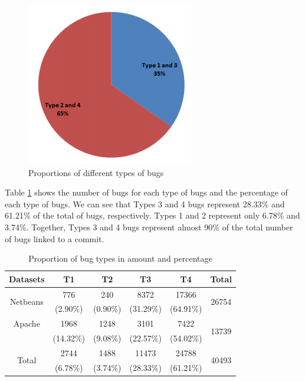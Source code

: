 \begin{figure}[h!]
  \centering
    \includegraphics[scale=0.7]{media/bug-taxo-rq1.png}
    \caption{Proportions of different types of bugs
    \label{fig:bug-taxo-rq1}}
\end{figure}

Table \ref{tab:bug-taxo-rq1-prop} shows the number of bugs for each type of bugs
and the percentage of each type of bugs. We can see that
Types 3 and 4 bugs represent 28.33\% and 61.21\% of the total
of bugs, respectively. Types 1 and 2 represent only 6.78\% and
3.74\%. Together, Types 3 and 4 bugs represent almost 90\%
of the total number of bugs linked to a commit.

\begin{table}[h!]
\centering

\begin{tabular}{c|c|c|c|c|c}
Datasets                  & T1        & T2       & T3        & T4        & Total                  \\ \hline \hline
\multirow{2}{*}{Netbeans} & 776       & 240      & 8372      & 17366     & \multirow{2}{*}{26754} \\
                          & (2.90\%)  & (0.90\%) & (31.29\%) & (64.91\%) &                        \\ \hline
Apache                    & 1968      & 1248     & 3101      & 7422      & \multirow{2}{*}{13739} \\
                          & (14.32\%) & (9.08\%) & (22.57\%) & (54.02\%) &                        \\ \hline
\multirow{2}{*}{Total}    & 2744      & 1488     & 11473     & 24788     & \multirow{2}{*}{40493} \\
                          & (6.78\%)  & (3.74\%) & (28.33\%) & (61.21\%) & \\ \hline \hline
\end{tabular}
\caption{Proportion of bug types in amount and percentage}
\label{tab:bug-taxo-rq1-prop}
\end{table}


